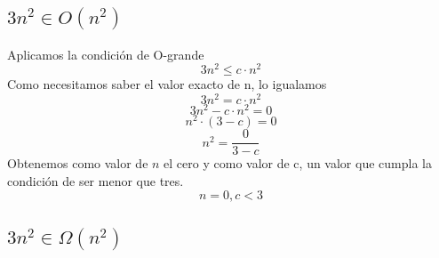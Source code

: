 \begin{twocolumn}


\subsection{$3n^2 \in O(n^2)$}

Aplicamos la condición de O-grande
\begin{displaymath}
3n^2 \leq c \cdot n^2
\end{displaymath}
Como necesitamos saber el valor exacto de n, lo igualamos
\begin{displaymath}
3n^2 = c \cdot n^2
\end{displaymath}
\begin{displaymath}
3n^2 - c \cdot n^2 = 0
\end{displaymath}
\begin{displaymath}
n^2 \cdot (3 - c) = 0
\end{displaymath}
\begin{displaymath}
n^2 = \frac{0}{3 - c}
\end{displaymath}
Obtenemos como valor de $n$ el cero y como valor de c, un valor que cumpla la condición de ser menor que tres.
\begin{displaymath}
n = 0, c < 3
\end{displaymath}

\subsection{$3n^2 \in \Omega(n^2)$}


\end{twocolumn}

